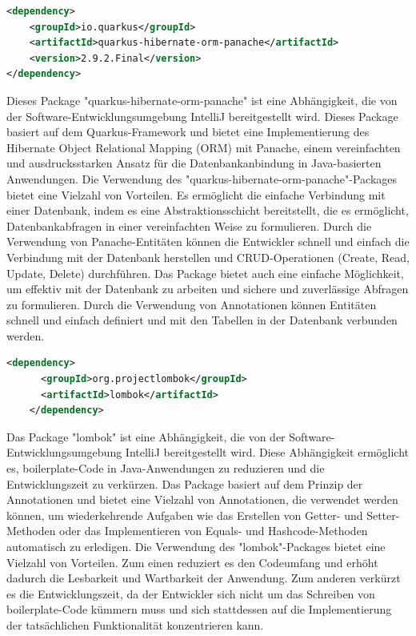 \newpage
\begin{lstlisting}[language=XML,caption=Dependency | hibernate-orm-panache,label=lst:impl:foo]
    <dependency>
    <groupId>io.quarkus</groupId>
    <artifactId>quarkus-hibernate-orm-panache</artifactId>
    <version>2.9.2.Final</version>
</dependency>
\end{lstlisting}

Dieses Package "quarkus-hibernate-orm-panache" \cite{QuarkusHibernate} ist eine Abhängigkeit, die von der Software-Entwicklungsumgebung IntelliJ bereitgestellt wird. Dieses Package basiert auf dem Quarkus-Framework und bietet eine Implementierung des Hibernate Object Relational Mapping (ORM) mit Panache, einem vereinfachten und ausdrucksstarken Ansatz für die Datenbankanbindung in Java-basierten Anwendungen.
\newline
\newline
Die Verwendung des "quarkus-hibernate-orm-panache"-Packages bietet eine Vielzahl von Vorteilen. Es ermöglicht die einfache Verbindung mit einer Datenbank, indem es eine Abstraktionsschicht bereitstellt, die es ermöglicht, Datenbankabfragen in einer vereinfachten Weise zu formulieren. Durch die Verwendung von Panache-Entitäten können die Entwickler schnell und einfach die Verbindung mit der Datenbank herstellen und CRUD-Operationen (Create, Read, Update, Delete) durchführen.
\newline
\newline
Das Package bietet auch eine einfache Möglichkeit, um effektiv mit der Datenbank zu arbeiten und sichere und zuverlässige Abfragen zu formulieren. Durch die Verwendung von Annotationen können Entitäten schnell und einfach definiert und mit den Tabellen in der Datenbank verbunden werden.

\newpage
\begin{lstlisting}[language=XML,caption=Dependency | lombok,label=lst:impl:foo]
    <dependency>
      <groupId>org.projectlombok</groupId>
      <artifactId>lombok</artifactId>
    </dependency>
\end{lstlisting}

Das Package "lombok" ist eine Abhängigkeit, die von der Software-Entwicklungsumgebung IntelliJ bereitgestellt wird. Diese Abhängigkeit ermöglicht es, boilerplate-Code in Java-Anwendungen zu reduzieren und die Entwicklungszeit zu verkürzen.
\newline
\newline
Das Package basiert auf dem Prinzip der Annotationen und bietet eine Vielzahl von Annotationen, die verwendet werden können, um wiederkehrende Aufgaben wie das Erstellen von Getter- und Setter-Methoden oder das Implementieren von Equals- und Hashcode-Methoden automatisch zu erledigen.
\newline
\newline
Die Verwendung des "lombok"-Packages bietet eine Vielzahl von Vorteilen. Zum einen reduziert es den Codeumfang und erhöht dadurch die Lesbarkeit und Wartbarkeit der Anwendung. Zum anderen verkürzt es die Entwicklungszeit, da der Entwickler sich nicht um das Schreiben von boilerplate-Code kümmern muss und sich stattdessen auf die Implementierung der tatsächlichen Funktionalität konzentrieren kann.

